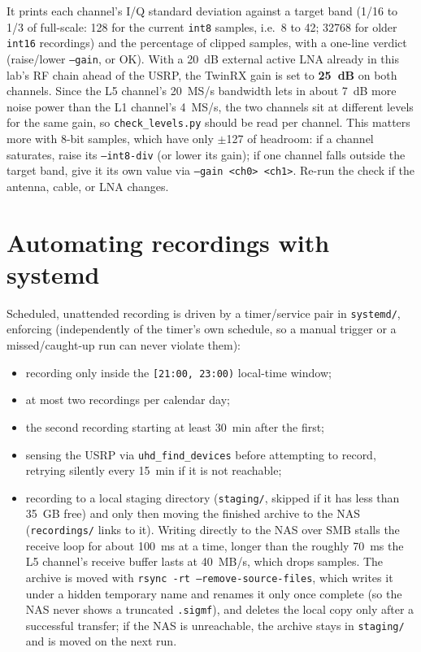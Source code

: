 \documentclass[11pt,a4paper]{article}
\begin{document}
It prints each channel's I/Q standard deviation against a target band (1/16 to 1/3 of full-scale: 128 for the current \texttt{int8} samples, i.e.\ 8 to 42; 32768 for older \texttt{int16} recordings) and the percentage of clipped samples, with a one-line verdict (raise/lower \texttt{--gain}, or OK). With a 20~dB external active LNA already in this lab's RF chain ahead of the USRP, the TwinRX gain is set to \textbf{25~dB} on both channels. Since the L5 channel's 20~MS/s bandwidth lets in about 7~dB more noise power than the L1 channel's 4~MS/s, the two channels sit at different levels for the same gain, so \texttt{check\_levels.py} should be read per channel. This matters more with 8-bit samples, which have only $\pm$127 of headroom: if a channel saturates, raise its \texttt{--int8-div} (or lower its gain); if one channel falls outside the target band, give it its own value via \texttt{--gain <ch0> <ch1>}. Re-run the check if the antenna, cable, or LNA changes.

\section{Automating recordings with systemd}
\label{sec:record-service}

Scheduled, unattended recording is driven by a timer/service pair in \texttt{systemd/}, enforcing (independently of the timer's own schedule, so a manual trigger or a missed/caught-up run can never violate them):

\begin{itemize}[leftmargin=*]
    \item recording only inside the \texttt{[21:00, 23:00)} local-time window;
    \item at most two recordings per calendar day;
    \item the second recording starting at least 30~min after the first;
    \item sensing the USRP via \texttt{uhd\_find\_devices} before attempting to record, retrying silently every 15~min if it is not reachable;
    \item recording to a local staging directory (\texttt{staging/}, skipped if it has less than 35~GB free) and only then moving the finished archive to the NAS (\texttt{recordings/} links to it). Writing directly to the NAS over SMB stalls the receive loop for about 100~ms at a time, longer than the roughly 70~ms the L5 channel's receive buffer lasts at 40~MB/s, which drops samples. The archive is moved with \texttt{rsync -rt --remove-source-files}, which writes it under a hidden temporary name and renames it only once complete (so the NAS never shows a truncated \texttt{.sigmf}), and deletes the local copy only after a successful transfer; if the NAS is unreachable, the archive stays in \texttt{staging/} and is moved on the next run.
\end{itemize}
\end{document}
